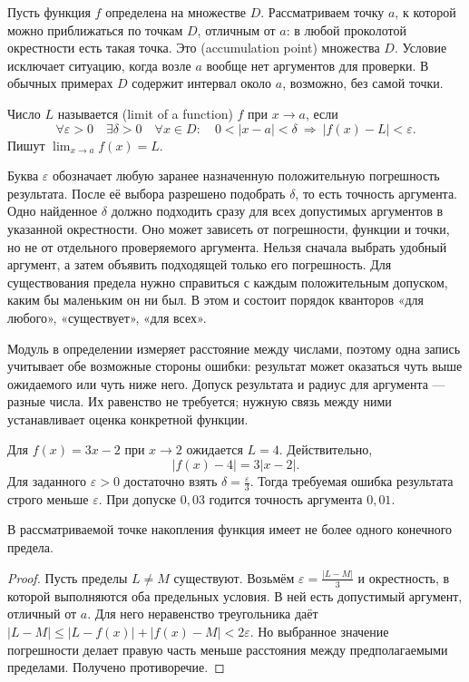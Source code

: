 Пусть функция \(f\) определена на множестве \(D\). Рассматриваем точку \(a\), к которой можно приближаться по точкам \(D\), отличным от \(a\): в любой проколотой окрестности есть такая точка. Это  (accumulation point) множества \(D\). Условие исключает ситуацию, когда возле \(a\) вообще нет аргументов для проверки. В обычных примерах \(D\) содержит интервал около \(a\), возможно, без самой точки.

\begin{definition}
Число \(L\) называется  (limit of a function) \(f\) при \(x\to a\), если
\[
\forall\varepsilon>0\quad\exists\delta>0\quad
\forall x\in D:\quad 0<|x-a|<\delta\ \Longrightarrow\ |f(x)-L|<\varepsilon.
\]
Пишут \(\lim_{x\to a}f(x)=L\).
\end{definition}

Буква \(\varepsilon\) обозначает любую заранее назначенную положительную погрешность результата. После её выбора разрешено подобрать \(\delta\), то есть точность аргумента. Одно найденное \(\delta\) должно подходить сразу для всех допустимых аргументов в указанной окрестности. Оно может зависеть от погрешности, функции и точки, но не от отдельного проверяемого аргумента. Нельзя сначала выбрать удобный аргумент, а затем объявить подходящей только его погрешность. Для существования предела нужно справиться с каждым положительным допуском, каким бы маленьким он ни был. В этом и состоит порядок кванторов «для любого», «существует», «для всех».

Модуль в определении измеряет расстояние между числами, поэтому одна запись учитывает обе возможные стороны ошибки: результат может оказаться чуть выше ожидаемого или чуть ниже него. Допуск результата и радиус для аргумента --- разные числа. Их равенство не требуется; нужную связь между ними устанавливает оценка конкретной функции.

\begin{example}
Для \(f(x)=3x-2\) при \(x\to2\) ожидается \(L=4\). Действительно,
\[
|f(x)-4|=3|x-2|.
\]
Для заданного \(\varepsilon>0\) достаточно взять \(\delta=\frac\varepsilon3\). Тогда требуемая ошибка результата строго меньше \(\varepsilon\). При допуске \(0{,}03\) годится точность аргумента \(0{,}01\).
\end{example}

\begin{theorem}\label{thm:legacy-c19-1}
В рассматриваемой точке накопления функция имеет не более одного конечного предела.
\end{theorem}
\begin{proof}
Пусть пределы \(L\ne M\) существуют. Возьмём \(\varepsilon=\frac{|L-M|}{3}\) и окрестность, в которой выполняются оба предельных условия. В ней есть допустимый аргумент, отличный от \(a\). Для него неравенство треугольника даёт \(|L-M|\le |L-f(x)|+|f(x)-M|<2\varepsilon\). Но выбранное значение погрешности делает правую часть меньше расстояния между предполагаемыми пределами. Получено противоречие.
\end{proof}

